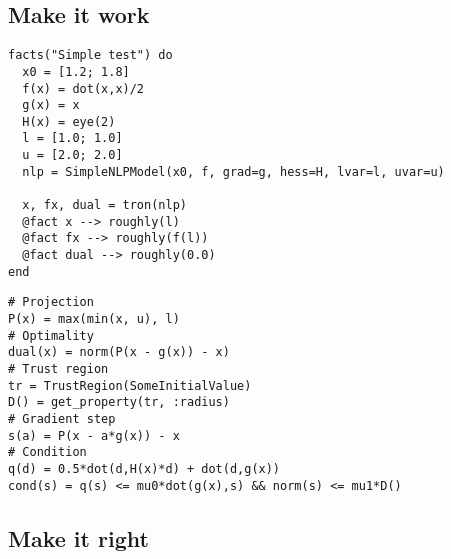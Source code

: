 \subsection{Make it work}



\begin{frame}[t,fragile]
  \begin{verbatim}
facts("Simple test") do
  x0 = [1.2; 1.8]
  f(x) = dot(x,x)/2
  g(x) = x
  H(x) = eye(2)
  l = [1.0; 1.0]
  u = [2.0; 2.0]
  nlp = SimpleNLPModel(x0, f, grad=g, hess=H, lvar=l, uvar=u)

  x, fx, dual = tron(nlp)
  @fact x --> roughly(l)
  @fact fx --> roughly(f(l))
  @fact dual --> roughly(0.0)
end
\end{verbatim}
\end{frame}

\begin{frame}[t,fragile]
  \begin{verbatim}
# Projection
P(x) = max(min(x, u), l)
# Optimality
dual(x) = norm(P(x - g(x)) - x)
# Trust region
tr = TrustRegion(SomeInitialValue)
D() = get_property(tr, :radius)
# Gradient step
s(a) = P(x - a*g(x)) - x
# Condition
q(d) = 0.5*dot(d,H(x)*d) + dot(d,g(x))
cond(s) = q(s) <= mu0*dot(g(x),s) && norm(s) <= mu1*D()
\end{verbatim}
\end{frame}

\subsection{Make it right}

